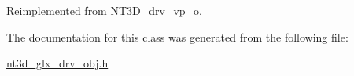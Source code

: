Reimplemented from \hyperlink{class_n_t3_d__drv__vp__o_a72ef9339925cf05076ccf3aae5d29d79}{NT3D\_\-drv\_\-vp\_\-o}.



The documentation for this class was generated from the following file:\begin{DoxyCompactItemize}
\item 
\hyperlink{nt3d__glx__drv__obj_8h}{nt3d\_\-glx\_\-drv\_\-obj.h}\end{DoxyCompactItemize}
